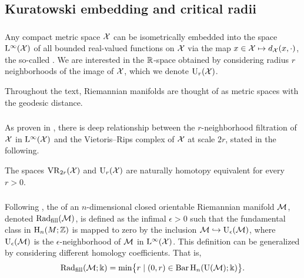 

\subsection{Kuratowski embedding and critical radii}\label{sub:filling radii}

\subsubsection{}

Any compact metric space $\cX$ can be isometrically embedded into the space $\rL^\infty(\cX)$ of all bounded real-valued functions on $\cX$ via the map $x \in \cX \mapsto d_\cX(x,\cdot)$, the so-called .
We are interested in the \(\R\)-space obtained by considering radius \(r\) neighborhoods of the image of \(\cX\), which we denote \(\rU_r(\cX)\).

Throughout the text, Riemannian manifolds are thought of as metric spaces with the geodesic distance.

\subsubsection{}\label{ss:kuratowski_vr}

As proven in \cite[Thm.~4.1]{lim2024vietoris}, there is deep relationship between the \(r\)-neighborhood filtration of $\cX$ in $\rL^\infty(\cX)$ and the Vietoris--Rips complex of \(\cX\) at scale \(2r\), stated in the following.

\medskip\proposition The spaces $\VR_{2r}(\cX)$ and $\rU_r(\cX)$ are naturally homotopy equivalent for every \(r > 0\).

\subsubsection{}

Following \cite{gromov1983filling}, the  of an \(n\)-dimensional closed orientable Riemannian manifold $\cM$, denoted \(\fillrad(\cM)\), is defined as the infimal $\epsilon > 0$ such that the fundamental class in $\rH_n(M; \Z)$ is mapped to zero by the inclusion $\cM \hookrightarrow \rU_\epsilon(\cM)$, where \(\rU_\epsilon(\cM)\) is the \(\epsilon\)-neighborhood of \(\cM\) in \(\rL^\infty(\cX)\).
This definition can be generalized by considering different homology coefficients.
That is,
\[
\fillrad(\cM; \field) = \min\set[\big]{r \mid (0, r) \in \barc \rH_n(\rU(\cM); \field)}.
\]

